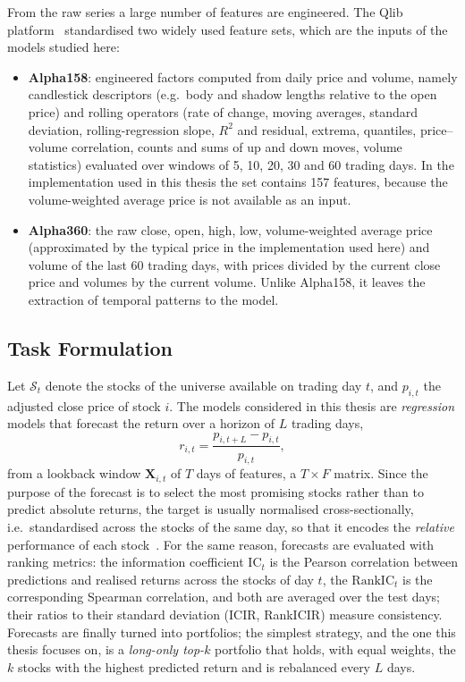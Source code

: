 From the raw series a large number of features are engineered. The Qlib platform~\cite{yang2020qlib} standardised two widely used feature sets, which are the inputs of the models studied here:
\begin{itemize}[noitemsep]
    \item \textbf{Alpha158}: engineered factors computed from daily price and volume, namely candlestick descriptors (e.g.\ body and shadow lengths relative to the open price) and rolling operators (rate of change, moving averages, standard deviation, rolling-regression slope, $R^2$ and residual, extrema, quantiles, price--volume correlation, counts and sums of up and down moves, volume statistics) evaluated over windows of 5, 10, 20, 30 and 60 trading days. In the implementation used in this thesis the set contains 157 features, because the volume-weighted average price is not available as an input.
    \item \textbf{Alpha360}: the raw close, open, high, low, volume-weighted average price (approximated by the typical price in the implementation used here) and volume of the last 60 trading days, with prices divided by the current close price and volumes by the current volume. Unlike Alpha158, it leaves the extraction of temporal patterns to the model.
\end{itemize}

\subsection{Task Formulation}
\label{sec:rw_task}

Let $\mathcal{S}_t$ denote the stocks of the universe available on trading day $t$, and $p_{i,t}$ the adjusted close price of stock $i$. The models considered in this thesis are \emph{regression} models that forecast the return over a horizon of $L$ trading days,
\begin{equation}
    \label{eq:rw_return}
    r_{i,t} = \frac{p_{i,t+L} - p_{i,t}}{p_{i,t}},
\end{equation}
from a lookback window $\mathbf{X}_{i,t}$ of $T$ days of features, a $T \times F$ matrix. Since the purpose of the forecast is to select the most promising stocks rather than to predict absolute returns, the target is usually normalised cross-sectionally, i.e.\ standardised across the stocks of the same day, so that it encodes the \emph{relative} performance of each stock~\cite{li2024master}. For the same reason, forecasts are evaluated with ranking metrics: the information coefficient $\mathrm{IC}_t$ is the Pearson correlation between predictions and realised returns across the stocks of day $t$, the $\mathrm{RankIC}_t$ is the corresponding Spearman correlation, and both are averaged over the test days; their ratios to their standard deviation (ICIR, RankICIR) measure consistency. Forecasts are finally turned into portfolios; the simplest strategy, and the one this thesis focuses on, is a \emph{long-only top-$k$} portfolio that holds, with equal weights, the $k$ stocks with the highest predicted return and is rebalanced every $L$ days.

